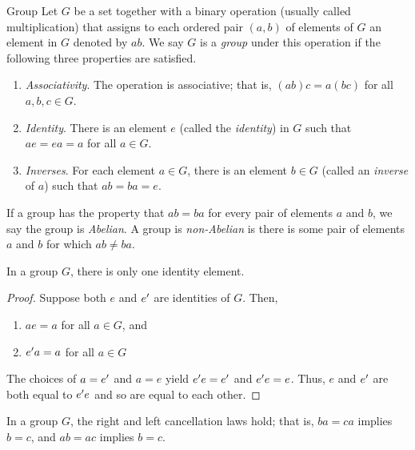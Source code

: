 \documentclass[../butidigress.tex]{subfiles}
\begin{document}
\begin{definition}{Group}
Let $G$ be a set together with a binary operation (usually called multiplication) that assigns to each ordered pair $(a,b)$ of elements of $G$ an element in $G$ denoted by $ab$.
We say $G$ is a \emph{group} under this operation if the following three properties are satisfied.
\begin{enumerate}\mathlist
    \item \emph{Associativity}. The operation is associative; that is, $(ab)c = a(bc)$ for all $a,b,c \in G$.
    \item \emph{Identity}. There is an element $e$ (called the \emph{identity}) in $G$ such that $ae=ea=a$ for all $a \in G$.
    \item \emph{Inverses}. For each element $a \in G$, there is an element $b \in G$ (called an \emph{inverse} of $a$) such that $ab=ba=e$.
\end{enumerate}
\end{definition}

If a group has the property that $ab = ba$ for every pair of elements $a$ and $b$, we say the group is \emph{Abelian}.
A group is \emph{non-Abelian} is there is some pair of elements $a$ and $b$ for which $ab\neq ba$.


\begin{theorem}
In a group $G$, there is only one identity element.
\end{theorem}

\begin{proof}
Suppose both $e$ and ${e}^{\prime}$ are identities of $G$.
Then,
\begin{enumerate}\mathlist
    \item $ae = a$ for all $a \in G$, and
    \item ${e}^{\prime}a = a$ for all $a \in G$
\end{enumerate}
The choices of $a = {e}^{\prime}$ and $a = e$ yield ${e}^{\prime}e = {e}^{\prime}$ and ${e}^{\prime}e = e$.
Thus, $e$ and ${e}^{\prime}$ are both equal to ${e}^{\prime}e$ and so are equal to each other.
\end{proof}

\begin{theorem}[Cancellation]
In a group $G$, the right and left cancellation laws hold; that is, $ba = ca$ implies $b = c$, and $ab = ac$ implies $b = c$.
\end{theorem}
\end{document}
